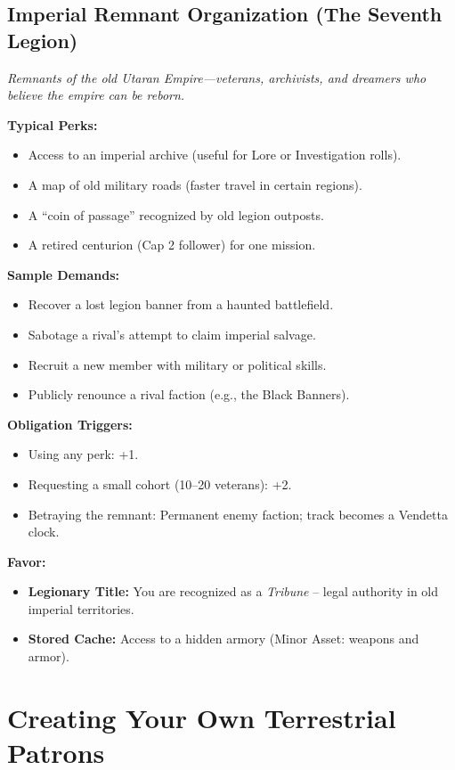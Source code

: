 \subsection{Imperial Remnant Organization (The Seventh Legion)}

\textit{Remnants of the old Utaran Empire—veterans, archivists, and dreamers who believe the empire can be reborn.}

\textbf{Typical Perks:}
\begin{itemize}
  \item Access to an imperial archive (useful for Lore or Investigation rolls).
  \item A map of old military roads (faster travel in certain regions).
  \item A “coin of passage” recognized by old legion outposts.
  \item A retired centurion (Cap 2 follower) for one mission.
\end{itemize}

\textbf{Sample Demands:}
\begin{itemize}
  \item Recover a lost legion banner from a haunted battlefield.
  \item Sabotage a rival’s attempt to claim imperial salvage.
  \item Recruit a new member with military or political skills.
  \item Publicly renounce a rival faction (e.g., the Black Banners).
\end{itemize}

\textbf{Obligation Triggers:}
\begin{itemize}
  \item Using any perk: +1.
  \item Requesting a small cohort (10–20 veterans): +2.
  \item Betraying the remnant: Permanent enemy faction; track becomes a Vendetta clock.
\end{itemize}

\textbf{Favor:}
\begin{itemize}
  \item \textbf{Legionary Title:} You are recognized as a \emph{Tribune} – legal authority in old imperial territories.
  \item \textbf{Stored Cache:} Access to a hidden armory (Minor Asset: weapons and armor).
\end{itemize}

\section{Creating Your Own Terrestrial Patrons}

